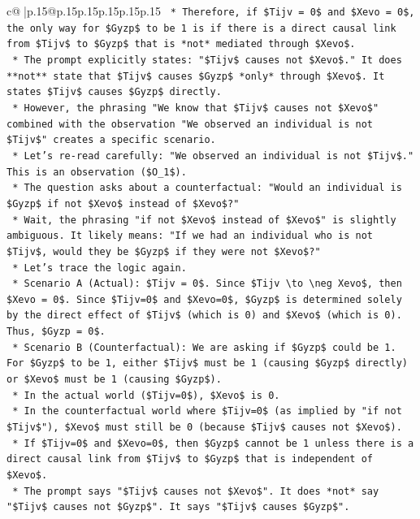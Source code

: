 \documentclass{article}
\begin{document}
{\begin{supertabular}{c@{$\;$}|p{.15\linewidth}@{}p{.15\linewidth}p{.15\linewidth}p{.15\linewidth}p{.15\linewidth}p{.15\linewidth}}
{{{\texttt{    *   Therefore, if \$Tijv = 0\$ and \$Xevo = 0\$, the only way for \$Gyzp\$ to be 1 is if there is a direct causal link from \$Tijv\$ to \$Gyzp\$ that is *not* mediated through \$Xevo\$.} \\
\texttt{    *   The prompt explicitly states: "\$Tijv\$ causes not \$Xevo\$." It does **not** state that \$Tijv\$ causes \$Gyzp\$ *only* through \$Xevo\$. It states \$Tijv\$ causes \$Gyzp\$ directly.} \\
\texttt{    *   However, the phrasing "We know that \$Tijv\$ causes not \$Xevo\$" combined with the observation "We observed an individual is not \$Tijv\$" creates a specific scenario.} \\
\texttt{    *   Let's re{-}read carefully: "We observed an individual is not \$Tijv\$." This is an observation (\$O\_1\$).} \\
\texttt{    *   The question asks about a counterfactual: "Would an individual is \$Gyzp\$ if not \$Xevo\$ instead of \$Xevo\$?"} \\
\texttt{    *   Wait, the phrasing "if not \$Xevo\$ instead of \$Xevo\$" is slightly ambiguous. It likely means: "If we had an individual who is not \$Tijv\$, would they be \$Gyzp\$ if they were not \$Xevo\$?"} \\
\texttt{    *   Let's trace the logic again.} \\
\texttt{        *   Scenario A (Actual): \$Tijv = 0\$. Since \$Tijv \textbackslash{}to \textbackslash{}neg Xevo\$, then \$Xevo = 0\$. Since \$Tijv=0\$ and \$Xevo=0\$, \$Gyzp\$ is determined solely by the direct effect of \$Tijv\$ (which is 0) and \$Xevo\$ (which is 0). Thus, \$Gyzp = 0\$.} \\
\texttt{        *   Scenario B (Counterfactual): We are asking if \$Gyzp\$ could be 1. For \$Gyzp\$ to be 1, either \$Tijv\$ must be 1 (causing \$Gyzp\$ directly) or \$Xevo\$ must be 1 (causing \$Gyzp\$).} \\
\texttt{        *   In the actual world (\$Tijv=0\$), \$Xevo\$ is 0.} \\
\texttt{        *   In the counterfactual world where \$Tijv=0\$ (as implied by "if not \$Tijv\$"), \$Xevo\$ must still be 0 (because \$Tijv\$ causes not \$Xevo\$).} \\
\texttt{        *   If \$Tijv=0\$ and \$Xevo=0\$, then \$Gyzp\$ cannot be 1 unless there is a direct causal link from \$Tijv\$ to \$Gyzp\$ that is independent of \$Xevo\$.} \\
\texttt{        *   The prompt says "\$Tijv\$ causes not \$Xevo\$". It does *not* say "\$Tijv\$ causes not \$Gyzp\$". It says "\$Tijv\$ causes \$Gyzp\$".} \\
}}}
\end{supertabular}}
\end{document}
